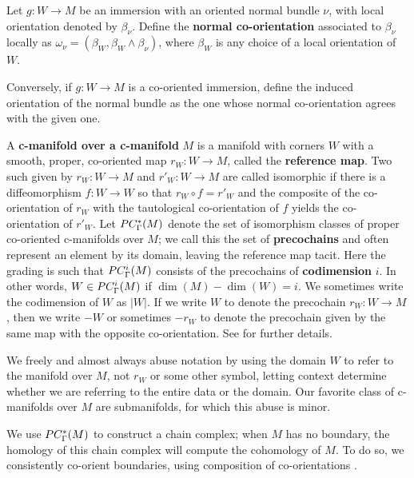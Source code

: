 \begin{definition}\label{D:normal co-or}
	Let $g \colon W \to M$ be an immersion with an oriented normal bundle $\nu$, with local orientation denoted by $\beta_\nu$.
	Define the \textbf{normal co-orientation} associated to $\beta_\nu$ locally as $\omega_{\nu} = (\beta_W, \beta_W \wedge \beta_\nu)$, where	$\beta_W$ is any choice of a local orientation of $W$.

	Conversely, if $g \colon W \to M$ is a co-oriented immersion, define the induced orientation of the normal bundle as the one whose normal co-orientation	agrees with the given one.
\end{definition}

\begin{definition}\label{V: maps are co-oriented}
	A \textbf{c-manifold over a c-manifold} $M$ is a
	manifold with corners $W$ with a smooth, proper, co-oriented map $r_W \colon W \to M$, called the \textbf{reference map}.
	Two such given by $r_W \colon W \to M$ and $r'_W \colon W \to M$ are called isomorphic if there is a diffeomorphism $f \colon W \to W$ so that $r_W \circ f = r'_W$ and the composite of the co-orientation of $r_W$ with the tautological co-orientation of $f$ yields the co-orientation of $r'_W$.
	Let $PC_\Gamma^*(M)$ denote the set of isomorphism classes of proper co-oriented c-manifolds over $M$; we call this the set of \textbf{precochains} and often represent an element by its domain, leaving the reference map tacit.
	Here the grading is such that $PC_\Gamma^i(M)$ consists of the precochains of \textbf{codimension} $i$.
	In other words, $W \in PC_\Gamma^i(M)$ if $\dim(M)-\dim(W) = i$.
	We sometimes write the codimension of $W$ as $|W|$.
	If we write $W$ to denote the precochain $r_W \colon W \to M$, then we write $-W$ or sometimes $-r_W$ to denote the precochain given by the same map with the opposite co-orientation.
	See \cite[Section 4.2]{medina2022foundations} for further details.
\end{definition}

We freely and almost always abuse notation by using the domain $W$ to refer to the manifold over $M$, not $r_W$ or some other symbol, letting context determine whether we are referring to the entire data or the domain.
Our favorite class of c-manifolds over $M$ are submanifolds, for which this abuse is minor.

We use $PC_\Gamma^*(M)$ to construct a chain complex; when $M$ has no boundary, the homology of this chain complex will compute the cohomology of $M$.
To do so, we consistently co-orient boundaries, using composition of co-orientations \cite[Section 3.3.2]{medina2022foundations}.

